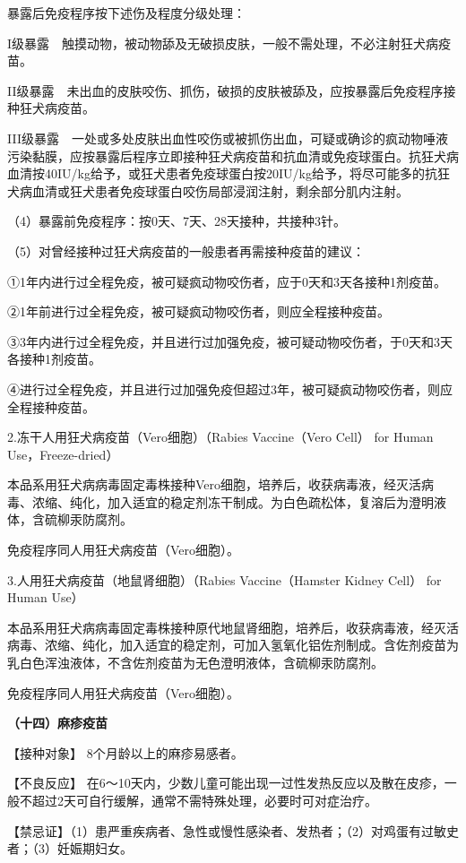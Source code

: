 暴露后免疫程序按下述伤及程度分级处理：

I级暴露　触摸动物，被动物舔及无破损皮肤，一般不需处理，不必注射狂犬病疫苗。

II级暴露　未出血的皮肤咬伤、抓伤，破损的皮肤被舔及，应按暴露后免疫程序接种狂犬病疫苗。

III级暴露　一处或多处皮肤出血性咬伤或被抓伤出血，可疑或确诊的疯动物唾液污染黏膜，应按暴露后程序立即接种狂犬病疫苗和抗血清或免疫球蛋白。抗狂犬病血清按40IU/kg给予，或狂犬患者免疫球蛋白按20IU/kg给予，将尽可能多的抗狂犬病血清或狂犬患者免疫球蛋白咬伤局部浸润注射，剩余部分肌内注射。

（4）暴露前免疫程序：按0天、7天、28天接种，共接种3针。

（5）对曾经接种过狂犬病疫苗的一般患者再需接种疫苗的建议：

①1年内进行过全程免疫，被可疑疯动物咬伤者，应于0天和3天各接种1剂疫苗。

②1年前进行过全程免疫，被可疑疯动物咬伤者，则应全程接种疫苗。

③3年内进行过全程免疫，并且进行过加强免疫，被可疑动物咬伤者，于0天和3天各接种1剂疫苗。

④进行过全程免疫，并且进行过加强免疫但超过3年，被可疑疯动物咬伤者，则应全程接种疫苗。

2.冻干人用狂犬病疫苗（Vero细胞）（Rabies Vaccine（Vero Cell） for Human
Use，Freeze-dried）

本品系用狂犬病病毒固定毒株接种Vero细胞，培养后，收获病毒液，经灭活病毒、浓缩、纯化，加入适宜的稳定剂冻干制成。为白色疏松体，复溶后为澄明液体，含硫柳汞防腐剂。

免疫程序同人用狂犬病疫苗（Vero细胞）。

3.人用狂犬病疫苗（地鼠肾细胞）（Rabies Vaccine（Hamster Kidney Cell）
for Human Use）

本品系用狂犬病病毒固定毒株接种原代地鼠肾细胞，培养后，收获病毒液，经灭活病毒、浓缩、纯化，加入适宜的稳定剂，可加入氢氧化铝佐剂制成。含佐剂疫苗为乳白色浑浊液体，不含佐剂疫苗为无色澄明液体，含硫柳汞防腐剂。

免疫程序同人用狂犬病疫苗（Vero细胞）。

\textbf{（十四）麻疹疫苗}

【接种对象】 8个月龄以上的麻疹易感者。

【不良反应】
在6～10天内，少数儿童可能出现一过性发热反应以及散在皮疹，一般不超过2天可自行缓解，通常不需特殊处理，必要时可对症治疗。

【禁忌证】（1）患严重疾病者、急性或慢性感染者、发热者；（2）对鸡蛋有过敏史者；（3）妊娠期妇女。


